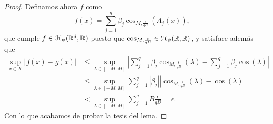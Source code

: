 \begin{proof}
    Definamos ahora $f$ como 
    \begin{equation}
        f(x) = \sum_{j=1}^q \beta_j 
        \cos_{M, \frac{\epsilon}{q B}}(A_j(x)),
    \end{equation}
    que cumple $f \in \mathcal{H}_\psi{(\mathbb{R}^d, \mathbb{R})}$  puesto que 
    $\cos_{M, \frac{\epsilon}{q B}} \in \mathcal{H}_\psi{(\mathbb{R}, \mathbb{R})}$, 
    y satisface además que
    \begin{equation}
        \begin{split}
        \sup_{x \in K} | f(x) - g(x)| 
        &\leq
        \sup_{\lambda \in [-M, M]} 
        | \sum_{j=1}^q \beta_j \cos_{M, \frac{\epsilon}{q B}}(\lambda )
         - 
         \sum_{j=1}^q \beta_j \cos(\lambda )|  \\
        &\leq
        \sup_{\lambda \in [-M, M]} 
        \sum_{j=1}^q 
            |\beta_j|
            |
                \cos_{M, \frac{\epsilon}{q B}}(\lambda)
                -
                \cos(\lambda)
            |
            \\   
            &<
            \sup_{\lambda \in [-M, M]} 
            \sum_{j=1}^q   
                B
                \frac{\epsilon}{q B}
            = \epsilon.
        \end{split}
    \end{equation}
     Con lo que acabamos de probar la tesis del lema. 
\end{proof}



